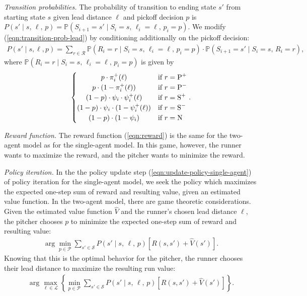 \documentclass{article}
\begin{document}
        {\it Transition probabilities.} The probability of transition to ending state $s'$ from starting state $s$ given lead distance $\ell$ and pickoff decision $p$ is $P(s' \mid s,\, \ell,\, p) = \mathbb{P}(S_{i+1} = s' \mid S_i = s,\, \ell_i = \ell,\, p_i = p)$. We modify (\ref{eqn:transition-prob-lead}) by conditioning additionally on the pickoff decision:
        \begin{align}
          \label{eqn:transition-prob-lead-pickoff}
          P(s' \mid s, \ell, p) = \sum_{r \in \mathcal{R}} \mathbb{P}(R_i = r \mid S_i = s,\, \ell_i = \ell,\, p_i = p) \cdot \mathbb{P}(S_{i+1} = s' \mid S_i = s,\, R_i = r),
        \end{align}
        where $\mathbb{P}(R_i = r \mid S_i = s,\, \ell_i = \ell,\, p_i = p)$ is given by
        \begin{align*}
            \begin{cases}
                \hfil p \cdot \pi_i^+(\ell)                             & \mbox{if } r = \mbox{P}^+\\
                \hfil p \cdot (1 - \pi_i^+(\ell))                       & \mbox{if } r = \mbox{P}^-\\
                \hfil (1 - p) \cdot \psi_i \cdot \psi_i^+(\ell)         & \mbox{if } r = \mbox{S}^+\\
                \hfil (1 - p) \cdot \psi_i \cdot (1 - \psi_i^+(\ell))   & \mbox{if } r = \mbox{S}^-\\
                \hfil (1 - p) \cdot (1 - \psi_i)                        & \mbox{if } r = \mbox{N}\\
            \end{cases}.
        \end{align*}

        {\it Reward function.} The reward function (\ref{eqn:reward}) is the same for the two-agent model as for the single-agent model. In this game, however, the runner wants to maximize the reward, and the pitcher wants to minimize the reward.

        {\it Policy iteration.} In the the policy update step (\ref{eqn:update-policy-single-agent}) of policy iteration for the single-agent model, we seek the policy which maximizes the expected one-step sum of reward and resulting value, given an estimated value function. In the two-agent model, there are game theoretic considerations. Given the estimated value function $\hat V$ and the runner's chosen lead distance $\ell$, the pitcher chooses $p$ to minimize the expected one-step sum of reward and resulting value:
        \begin{align*}
          \arg\min_{p\in\mathcal{P}} \sum_{s' \in \mathcal{S}} P(s' \mid s,\, \ell,\, p) [R(s, s') + \hat V(s')].
        \end{align*}
        Knowing that this is the optimal behavior for the pitcher, the runner chooses their lead distance to maximize the resulting run value:
        \begin{align*}
          \arg\max_{\ell \in \mathcal{L}}\left\{\min_{p\in\mathcal{P}} \sum_{s' \in \mathcal{S}} P(s' \mid s,\, \ell,\, p) [R(s, s') + \hat V(s')]\right\}.
        \end{align*}
\end{document}
